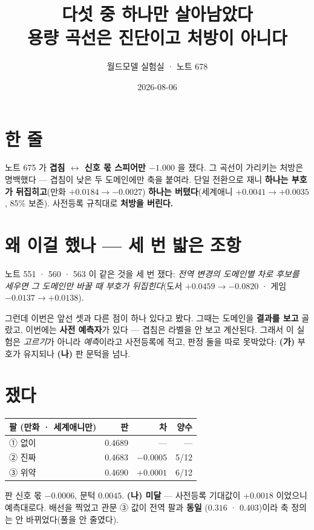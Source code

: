 \documentclass[10pt,a4paper]{article}
\title{\bfseries 다섯 중 하나만 살아남았다\\[2pt]
\large 용량 곡선은 진단이고 처방이 아니다}
\author{월드모델 실험실 · 노트 678}
\date{2026-08-06}
\begin{document}
\maketitle

\section{한 줄}

노트 675 가 \textbf{겹침 $\leftrightarrow$ 신호 몫 스피어만 $-1.000$} 을 쟀다. 그
곡선이 가리키는 처방은 명백했다 --- 겹침이 낮은 두 도메인에만 축을 붙여라. 단일
전환으로 재니 \textbf{하나는 부호가 뒤집히고}(만화 $+0.0184 \to -0.0027$)
\textbf{하나는 버텼다}(세계애니 $+0.0041 \to +0.0035$, 85\% 보존). 사전등록 규칙대로
\textbf{처방을 버린다.}

\section{왜 이걸 했나 --- 세 번 밟은 조항}

노트 551 · 560 · 563 이 같은 것을 세 번 쟀다: \emph{전역 변경의 도메인별 차로
후보를 세우면 그 도메인만 바꿀 때 부호가 뒤집힌다}(도서 $+0.0459 \to
\mathbf{-0.0820}$ · 게임 $-0.0137 \to \mathbf{+0.0138}$).

그런데 이번은 앞선 셋과 다른 점이 하나 있다고 봤다. 그때는 도메인을 \textbf{결과를
보고} 골랐고, 이번에는 \textbf{사전 예측자}가 있다 --- 겹침은 라벨을 안 보고
계산된다. 그래서 이 실험은 \emph{고르기}가 아니라 \emph{예측}이라고 사전등록에 적고,
판정 둘을 따로 못박았다: \textbf{(가)} 부호가 유지되나 \textbf{(나)} 판 문턱을 넘나.

\section{쟀다}

\begin{center}
\begin{tabular}{lrrr}
\toprule
팔 (만화 · 세계애니만) & 판 & 차 & 양수 \\
\midrule
① 없이 & 0.4689 & --- & --- \\
② 진짜 & 0.4683 & $-0.0005$ & 5/12 \\
③ 위약 & 0.4690 & $+0.0001$ & 6/12 \\
\bottomrule
\end{tabular}
\end{center}

판 신호 몫 $\mathbf{-0.0006}$, 문턱 $0.0045$. \textbf{(나) 미달} --- 사전등록 기대값이
$+0.0018$ 이었으니 예측대로다. 배선을 찍었고 관문 ③ 값이 전역 팔과 \textbf{동일}
($0.316$ · $0.403$)이라 축 정의는 안 바뀌었다(풀을 안 줄였다).
\end{document}
